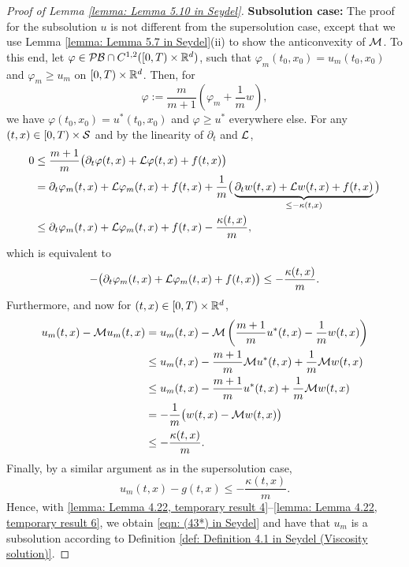 \begin{proof}[Proof of Lemma \ref{lemma: Lemma 5.10 in Seydel}]
    \textbf{Subsolution case:} The proof for the subsolution $u$ is not different from the supersolution case, except that we use Lemma \ref{lemma: Lemma 5.7 in Seydel}(ii) to show the anticonvexity of $\mathcal{M}$. To this end, let $\varphi \in \mathcal{PB} \cap C^{1,2}([0,T)\times \mathbb{R}^d)$, such that $\varphi_m(t_0,x_0) = u_m(t_0,x_0)$ and $\varphi_m \geq u_m$ on $[0,T) \times \mathbb{R}^d$. Then, for
    \begin{equation*}
        \varphi := \frac{m}{m+1} \left( \varphi_m + \frac{1}{m} w \right),
    \end{equation*}
    we have $\varphi(t_0,x_0) = u^*(t_0,x_0)$ and $\varphi \geq u^*$ everywhere else. For any $(t,x) \in [0,T) \times \mathcal{S}$ and by the linearity of $\partial_t$ and $\mathcal{L}$, 
    \begin{align*}
        0 &\leq \frac{m+1}{m} \big( \partial_t \varphi(t,x) + \mathcal{L} \varphi(t,x) + f(t,x) \big) \\
        &= \partial_t \varphi_m(t,x) + \mathcal{L} \varphi_m(t,x) + f(t,x) + \frac 1 m \big( \underbrace{\partial_t w(t,x) + \mathcal{L} w(t,x) + f(t,x)}_{\leq - \kappa(t,x)} \big) \\
        &\leq \partial_t \varphi_m(t,x) + \mathcal{L} \varphi_m(t,x) + f(t,x) - \frac{\kappa(t,x)}{m},
    \end{align*}
    which is equivalent to
    \begin{equation}
        - \big(\partial_t \varphi_m(t,x) + \mathcal{L} \varphi_m(t,x) + f(t,x) \big) \leq - \frac{\kappa(t,x)}{m}. 
        \label{lemma: Lemma 4.22, temporary result 4}
    \end{equation}
    Furthermore, and now for $(t,x) \in [0,T) \times \mathbb{R}^d$, 
    \begin{align}
        u_m(t,x) - \mathcal{M} u_m(t,x) &= u_m(t,x) - \mathcal{M} \left( \frac{m+1}{m}u^*(t,x) - \frac{1}{m}w(t,x) \right) \nonumber \\
        & \leq u_m(t,x) - \frac{m+1}{m}\mathcal{M} u^*(t,x) + \frac{1}{m} \mathcal{M} w(t,x) \nonumber \\
        & \leq u_m(t,x) - \frac{m+1}{m} u^*(t,x) + \frac 1 m \mathcal{M} w(t,x) \nonumber \\
        & = -\frac{1}{m} \big(w(t,x) - \mathcal{M} w(t,x) \big) \nonumber \\
        &\leq -\frac{\kappa(t,x)}{m}.
        \label{lemma: Lemma 4.22, temporary result 5}
    \end{align}
    Finally, by a similar argument as in the supersolution case,
    \begin{equation}
        u_m(t,x) - g(t,x) \leq - \frac{\kappa(t,x)}{m}.
        \label{lemma: Lemma 4.22, temporary result 6}
    \end{equation}
    Hence, with \eqref{lemma: Lemma 4.22, temporary result 4}--\eqref{lemma: Lemma 4.22, temporary result 6}, we obtain \eqref{eqn: (43*) in Seydel} and have that $u_m$ is a subsolution according to Definition \ref{def: Definition 4.1 in Seydel (Viscosity solution)}.
\end{proof}

